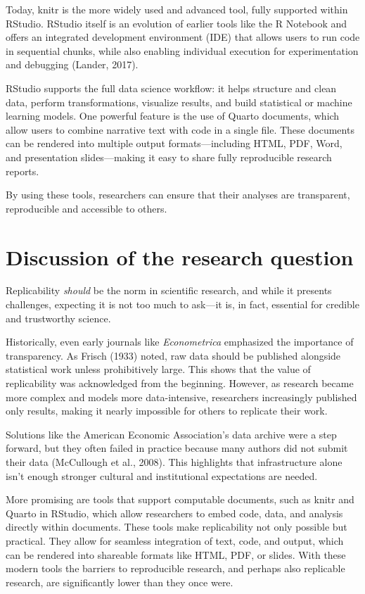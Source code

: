 \documentclass[
  a4paper,
]{article}
\begin{document}
Today, knitr is the more widely used and advanced tool, fully supported
within RStudio. RStudio itself is an evolution of earlier tools like the
R Notebook and offers an integrated development environment (IDE) that
allows users to run code in sequential chunks, while also enabling
individual execution for experimentation and debugging (Lander, 2017).

RStudio supports the full data science workflow: it helps structure and
clean data, perform transformations, visualize results, and build
statistical or machine learning models. One powerful feature is the use
of Quarto documents, which allow users to combine narrative text with
code in a single file. These documents can be rendered into multiple
output formats---including HTML, PDF, Word, and presentation
slides---making it easy to share fully reproducible research reports.

By using these tools, researchers can ensure that their analyses are
transparent, reproducible and accessible to others.

\section{Discussion of the research
question}\label{discussion-of-the-research-question}

Replicability \emph{should} be the norm in scientific research, and
while it presents challenges, expecting it is not too much to ask---it
is, in fact, essential for credible and trustworthy science.

Historically, even early journals like \emph{Econometrica} emphasized
the importance of transparency. As Frisch (1933) noted, raw data should
be published alongside statistical work unless prohibitively large. This
shows that the value of replicability was acknowledged from the
beginning. However, as research became more complex and models more
data-intensive, researchers increasingly published only results, making
it nearly impossible for others to replicate their work.

Solutions like the American Economic Association's data archive were a
step forward, but they often failed in practice because many authors did
not submit their data (McCullough et al., 2008). This highlights that
infrastructure alone isn't enough stronger cultural and institutional
expectations are needed.

More promising are tools that support computable documents, such as
knitr and Quarto in RStudio, which allow researchers to embed code,
data, and analysis directly within documents. These tools make
replicability not only possible but practical. They allow for seamless
integration of text, code, and output, which can be rendered into
shareable formats like HTML, PDF, or slides. With these modern tools the
barriers to reproducible research, and perhaps also replicable research,
are significantly lower than they once were.
\end{document}
